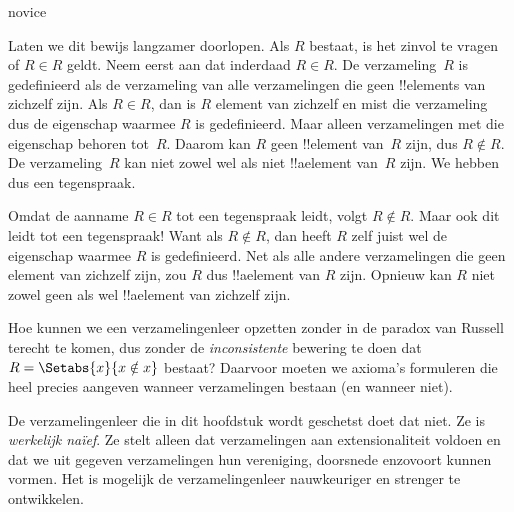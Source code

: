 \documentclass[../../../include/open-logic-section]{subfiles}
\begin{document}
\begin{tagblock}{novice}
\begin{explain}
Laten we dit bewijs langzamer doorlopen. Als $R$ bestaat, is het
zinvol te vragen of $R \in R$ geldt. Neem eerst aan dat inderdaad $R
\in R$. De verzameling~$R$ is gedefinieerd als de verzameling van alle
verzamelingen die geen !!{element}s van zichzelf zijn. Als $R \in R$,
dan is $R$ element van zichzelf en mist die verzameling dus de eigenschap
waarmee $R$ is gedefinieerd. Maar alleen verzamelingen met die eigenschap
behoren tot~$R$. Daarom kan $R$ geen !!{element} van~$R$ zijn, dus
$R \notin R$. De verzameling~$R$ kan niet zowel wel als niet
!!a{element} van~$R$ zijn. We hebben dus een tegenspraak.

Omdat de aanname $R \in R$ tot een tegenspraak leidt, volgt $R \notin
R$. Maar ook dit leidt tot een tegenspraak!{} Want als $R \notin R$,
dan heeft $R$ zelf juist wel de eigenschap waarmee $R$ is
gedefinieerd. Net als alle andere verzamelingen die geen element van
zichzelf zijn, zou $R$ dus !!a{element} van $R$ zijn. Opnieuw kan $R$
niet zowel geen als wel !!a{element} van zichzelf zijn.
\end{explain}
\end{tagblock}

\begin{digress}
Hoe kunnen we een verzamelingenleer opzetten zonder in de paradox van
Russell terecht te komen, dus zonder de \emph{inconsistente} bewering
te doen dat $R = \Setabs{x}{x \notin x}$ bestaat? Daarvoor moeten we
axioma's formuleren die heel precies aangeven wanneer verzamelingen
bestaan (en wanneer niet).
	
De verzamelingenleer die in dit hoofdstuk wordt geschetst doet dat
niet. Ze is \emph{werkelijk na\"ief}. Ze stelt alleen dat
verzamelingen aan extensionaliteit voldoen en dat we uit gegeven
verzamelingen hun vereniging, doorsnede enzovoort kunnen vormen. Het
is mogelijk de verzamelingenleer nauwkeuriger en strenger te ontwikkelen.
\end{digress}
\end{document}
